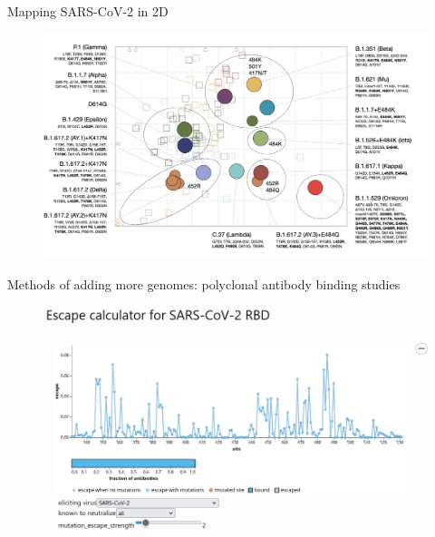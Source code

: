 \documentclass{beamer}
\begin{document}
\begin{frame}{Mapping SARS-CoV-2 in 2D}
    \begin{figure}
    \includegraphics[width=\textwidth]{sars_cov_2_map/wilks_3.png}
\end{figure}   
\centering
\vfill
\tiny{\cite{wilksMappingSARSCoV2Antigenic2022}}
\end{frame}

\begin{frame}{Methods of adding more genomes: polyclonal antibody binding studies}
    \begin{figure}
        \includegraphics[width=\textwidth]{standalone/2022-07-06-13-06-32.png}
    \end{figure}
    \centering
\vfill
\tiny{\cite{greaney2022antibody}}
\end{frame}
\end{document}
